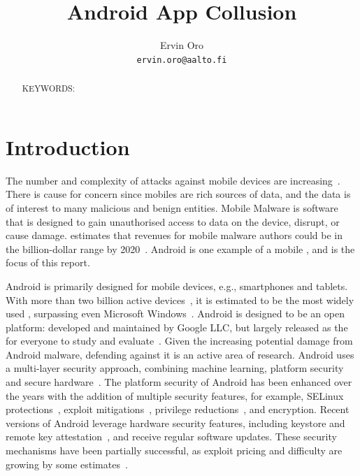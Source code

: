 \documentclass[article, oneside]{aaltoseries}
\title{Android App Collusion}
\author{Ervin Oro%
\\\textnormal{\texttt{ervin.oro@aalto.fi}}} %
\affiliation{\textbf{Tutor}: Jorden Whitefield} %
\newcommand{\TODO}[1]{\todo[inline]{#1}}
\renewcommand\gls\cgls \renewcommand\glspl\cglspl
\begin{document}

\maketitle
{}

\begin{abstract}
\TODO{abstract}

\vspace{3mm}
\noindent KEYWORDS: 

\end{abstract}


\section{Introduction}
\label{sec:intro}
%
The number and complexity of attacks against mobile devices
are increasing~\cite{AOSP,AVTESTGH2018}. There is cause for
concern since mobiles are rich sources of data, and the data
is of interest to many malicious and benign entities. Mobile
Malware is software that is designed to gain unauthorised
access to data on the device, disrupt, or cause damage.
\citeauthor{McAfee2018} estimates that revenues for mobile
malware authors could be in the billion-dollar range by
2020~\cite{McAfee2018}. Android is one example of a mobile
\gls{os}, and is the focus of this report.

Android is primarily designed for mobile devices, e.g.,
smartphones and tablets. With more than two billion active
devices~\cite{AOSP2018}, it is estimated to be the most
widely used \gls{os}, surpassing even Microsoft
Windows~\cite{AWSLLC2018, StatCounter2018}. Android is
designed to be an open platform: developed and maintained by
Google LLC, but largely released as the \citeauthor{AOSP}
for everyone to study and evaluate~\cite{AOSP}. Given the
increasing potential damage from Android malware, defending
against it is an active area of research. Android uses a
multi-layer security approach, combining machine
learning, platform security and secure
hardware~\cite{AOSP2018}. The platform security of Android
has been enhanced over the years with the addition of
multiple security features, for example, SELinux
protections~\cite[\href{https://source.android.com/security/selinux}{``Security-Enhanced
Linux in Android''}]{AOSPsecurity}, exploit
mitigations~\cite{Edge2016}, privilege
reductions~\cite{Lawrence2017}, and encryption. Recent
versions of Android leverage hardware security features,
including keystore and remote key
attestation~\cite{Willden2017}, and receive regular software
updates. These security mechanisms have been partially
successful, as exploit pricing and difficulty are growing by
some estimates~\cite{AOSP2018}.
\end{document}
